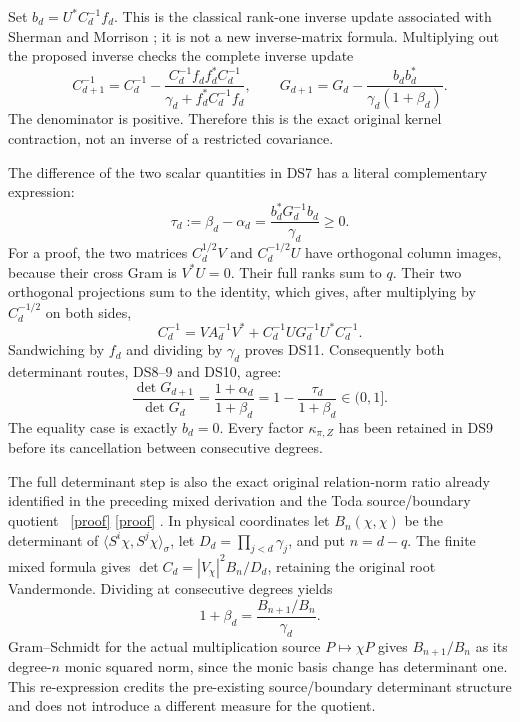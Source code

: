 \documentclass[11pt]{article}
\begin{document}
Set \(b_d=U^*C_d^{-1}f_d\). This is the classical rank-one inverse
update associated with Sherman and Morrison \cite{SM}; it is not a new
inverse-matrix formula. Multiplying out the proposed inverse
checks the complete inverse update
\begin{equation}\label{eq:inverseupdate}
C_{d+1}^{-1}=C_d^{-1}
-\frac{C_d^{-1}f_df_d^*C_d^{-1}}
{\gamma_d+f_d^*C_d^{-1}f_d},\qquad
G_{d+1}=G_d-\frac{b_db_d^*}{\gamma_d(1+\beta_d)}.
\tag{DS10}
\end{equation}
The denominator is positive. Therefore this is the exact original
kernel contraction, not an inverse of a restricted covariance.

The difference of the two scalar quantities in DS7 has a literal
complementary expression:
\begin{equation}\label{eq:gap}
\boxed{\tau_d:=\beta_d-\alpha_d
=\frac{b_d^*G_d^{-1}b_d}{\gamma_d}\geq0.}
\tag{DS11}
\end{equation}
For a proof, the two matrices \(C_d^{1/2}V\) and \(C_d^{-1/2}U\)
have orthogonal column images, because their cross Gram is \(V^*U=0\).
Their full ranks sum to \(q\). Their two orthogonal projections sum
to the identity, which gives, after multiplying by \(C_d^{-1/2}\)
on both sides,
\[
C_d^{-1}=VA_d^{-1}V^*
+C_d^{-1}UG_d^{-1}U^*C_d^{-1}.
\]
Sandwiching by \(f_d\) and dividing by \(\gamma_d\) proves DS11.
Consequently both determinant routes, DS8--9 and DS10, agree:
\begin{equation}\label{eq:kernelstep}
\boxed{\frac{\det G_{d+1}}{\det G_d}
=\frac{1+\alpha_d}{1+\beta_d}
=1-\frac{\tau_d}{1+\beta_d}\in(0,1].}
\tag{DS12}
\end{equation}
The equality case is exactly \(b_d=0\). Every factor
\(\kappa_{\pi,Z}\) has been retained in DS9 before its cancellation
between consecutive degrees.

The full determinant step is also the exact original relation-norm
ratio already identified in the preceding mixed derivation and the
Toda source/boundary quotient \cite{Mixed,Toda}%
~\href{https://github.com/KokunoYumeto/zeta-function-research-reader/blob/5992ad50c0f2a06921f1fcaded7b4e38097c0739/workbenches/splitzero-tandem/continuations/20260920-original-kernel-mixed-determinants/MIXED_CONFLUENT_PROOF.tex\#L1}{[proof]} \href{https://github.com/KokunoYumeto/zeta-function-research-reader/blob/5992ad50c0f2a06921f1fcaded7b4e38097c0739/workbenches/splitzero-tandem/continuations/20260920-original-kernel-mixed-determinants/providers/TODA_VOLUME_CONTROL.tex\#L1}{[proof]}%
{}. In physical coordinates
let \(B_n(\chi,\chi)\) be the determinant of
\(\langle S^i\chi,S^j\chi\rangle_\sigma\), let
\(D_d=\prod_{j<d}\gamma_j\), and put \(n=d-q\).
The finite mixed formula gives
\(\det C_d=|V_\chi|^2B_n/D_d\), retaining the original root
Vandermonde. Dividing at consecutive degrees yields
\[
1+\beta_d=\frac{B_{n+1}/B_n}{\gamma_d}.
\]
Gram--Schmidt for the actual multiplication source
\(P\mapsto\chi P\) gives \(B_{n+1}/B_n\) as its degree-\(n\)
monic squared norm, since the monic basis change has determinant one.
This re-expression credits the pre-existing source/boundary determinant
structure and does not introduce a different measure for the quotient.
\end{document}
